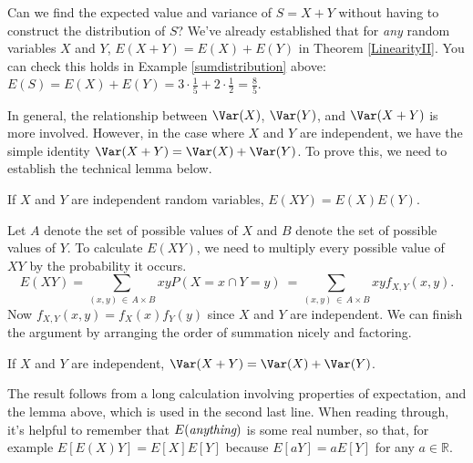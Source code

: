 Can we find the expected value and variance of $S = X + Y$ without having to construct the distribution of $S$? We've already established that for \emph{any} random variables $X$ and $Y$, $E(X+Y) = E(X)+E(Y)$ in Theorem \ref{LinearityII}. You can check this holds in Example \ref{sumdistribution} above: $E(S) = E(X) + E(Y) = 3 \cdot \frac{1}{5} + 2 \cdot \frac{1}{2} = \frac{8}{5}$.
\par
In general, the relationship between $\Var(X)$, $\Var(Y)$, and $\Var(X+Y)$ is more involved. However, in the case where $X$ and $Y$ are independent, we have the simple identity $\Var(X+Y) = \Var(X) + \Var(Y)$. To prove this, we need to establish the technical lemma below.

\begin{lem}\label{ExpectationIndependentProduct} If $X$ and $Y$ are independent random variables, $E(XY) = E(X)E(Y)$.
\end{lem}
\begin{pf} Let $A$ denote the set of possible values of $X$ and $B$ denote the set of possible values of $Y$. To calculate $E(XY)$, we need to multiply every possible value of $XY$ by the probability it occurs.
$$E(XY) = \sum_{(x, y) \,\in\, A \times B} xy P(X = x \cap Y= y) \ = \sum_{(x, y) \,\in\, A \times B} xy f_{X,Y}(x,y).$$
\noindent Now $f_{X,Y}(x,y) = f_X(x)f_Y(y)$ since $X$ and $Y$ are independent. We can finish the argument by arranging the order of summation nicely and factoring. 
\end{pf}

\begin{thm}\label{VarianceIndependentSum} If $X$ and $Y$ are independent, $\Var(X+Y) = \Var(X) + \Var(Y)$.
\end{thm}
\begin{pf} The result follows from a long calculation involving properties of expectation, and the lemma above, which is used in the second last line. When reading through, it's helpful to remember that $E(\emph{anything})$ is some real number, so that, for example $E[E(X)Y] = E[X]E[Y]$ because $E[aY] = aE[Y]$ for any $a \in \mathbb{R}$.
\end{pf}

